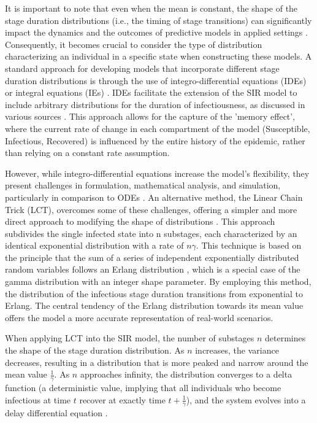 \documentclass[12pt]{article}
\begin{document}
It is important to note that even when the mean is constant, the shape of the stage duration distributions (i.e., the timing of stage transitions) can significantly impact the dynamics and the outcomes of predictive models in applied settings \cite{krylova2013effects}\cite{keeling2002understanding}\cite{wearing2005appropriate}\cite{nguyen2008noise}. Consequently, it becomes crucial to consider the type of distribution characterizing an individual in a specific state when constructing these models. A standard approach for developing models that incorporate different stage duration distributions is through the use of integro-differential equations (IDEs) or integral equations (IEs) \cite{hurtado2019generalizations}\cite{kermack1927contribution}\cite{hethcote1980integral}. IDEs facilitate the extension of the SIR model to include arbitrary distributions for the duration of infectiousness, as discussed in various sources \cite{feng2000endemic}\cite{hethcote1980integral}\cite{ma2006generality}. This approach allows for the capture of the 'memory effect', where the current rate of change in each compartment of the model (Susceptible, Infectious, Recovered) is influenced by the entire history of the epidemic, rather than relying on a constant rate assumption.

However, while integro-differential equations increase the model's flexibility, they present challenges in formulation, mathematical analysis, and simulation, particularly in comparison to ODEs \cite{krylova2013effects}\cite{hurtado2019generalizations}\cite{burton2005volterra}. An alternative method, the Linear Chain Trick (LCT), overcomes some of these challenges, offering a simpler and more direct approach to modifying the shape of distributions \cite{macdonald1978time}\cite{smith2011introduction}. This approach subdivides the single infected state into n substages, each characterized by an identical exponential distribution with a rate of $n\gamma$. This technique is based on the principle that the sum of a series of independent exponentially distributed random variables follows an Erlang distribution \cite{krylova2013effects}\cite{therrien2018probability}, which is a special case of the gamma distribution with an integer shape parameter. By employing this method, the distribution of the infectious stage duration transitions from exponential to Erlang. The central tendency of the Erlang distribution towards its mean value offers the model a more accurate representation of real-world scenarios.

When applying LCT into the SIR model, the number of substages $n$ determines the shape of the stage duration distribution. As $n$ increases, the variance decreases, resulting in a distribution that is more peaked and narrow around the mean value $\frac{1}{\gamma}$. As $n$ approaches infinity, the distribution converges to a delta function (a deterministic value, implying that all individuals who become infectious at time $t$ recover at exactly time $t + \frac{1}{\gamma}$), and the system evolves into a delay differential equation \cite{krylova2013effects}\cite{hethcote1980integral}.
\end{document}
